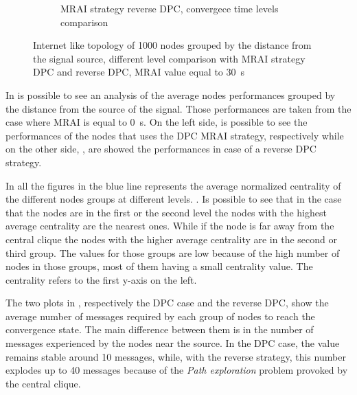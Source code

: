 \begin{figure}[h]
\begin{subfigure}[b]{0.45\textwidth}
		 \caption{\ac{MRAI} strategy reverse \ac{DPC}, convergece time levels comparison}
         \label{fig:different_levels_comparison_reverse_dpc_time}
     \end{subfigure}
     \hfill
	 \caption{Internet like topology of \num{1000} nodes grouped by the distance
	 from the signal source, different level comparison with \ac{MRAI} strategy
	 \ac{DPC} and reverse \ac{DPC}, \ac{MRAI} value equal to \SI{30}{\second}
	 }
	 \label{fig:different_levels_comparison}
\end{figure}

In  is possible to see an analysis of the
average nodes performances grouped by the distance from the source of the signal.
Those performances are taken from the case where \ac{MRAI} is equal to
\SI{0}{\second}.
On the left side, is possible to see the performances of the nodes that uses the
\ac{DPC} \ac{MRAI} strategy, respectively 
while on the other side, ,
are showed the performances in case of a reverse \ac{DPC} strategy.

In all the figures in  the blue line
represents the average normalized centrality of the different nodes groups at different
levels. .
Is possible to see that in the case that the nodes are in the first or the
second level the nodes with the highest average centrality are the nearest ones.
While if the node is far away from the central clique the nodes with the 
higher average centrality are in the second or third group.
The values for those groups are low because of the high number of nodes
in those groups, most of them having a small centrality value.
The centrality refers to the first y-axis on the left.

The two plots in ,
respectively the \ac{DPC} case and the reverse \ac{DPC},
show the average number of messages required by each group of nodes to reach
the convergence state.
The main difference between them is in the number of messages experienced by
the nodes near the source.
In the \ac{DPC} case, the value remains stable around \num{10} messages, while,
with the reverse strategy, this number explodes up to \num{40} messages because
of the \textit{Path exploration} problem provoked by the central clique.

